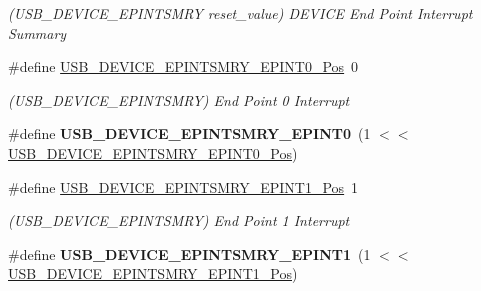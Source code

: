 \begin{DoxyCompactItemize}
\begin{DoxyCompactList}\small\item\em (U\+S\+B\+\_\+\+D\+E\+V\+I\+C\+E\+\_\+\+E\+P\+I\+N\+T\+S\+M\+R\+Y reset\+\_\+value) D\+E\+V\+I\+C\+E End Point Interrupt Summary \end{DoxyCompactList}\item 
\hypertarget{group___s_a_m_l21___u_s_b_ga229995656d4953a009cf0d87c9ba54a9}{}\#define \hyperlink{group___s_a_m_l21___u_s_b_ga229995656d4953a009cf0d87c9ba54a9}{U\+S\+B\+\_\+\+D\+E\+V\+I\+C\+E\+\_\+\+E\+P\+I\+N\+T\+S\+M\+R\+Y\+\_\+\+E\+P\+I\+N\+T0\+\_\+\+Pos}~0\label{group___s_a_m_l21___u_s_b_ga229995656d4953a009cf0d87c9ba54a9}

\begin{DoxyCompactList}\small\item\em (U\+S\+B\+\_\+\+D\+E\+V\+I\+C\+E\+\_\+\+E\+P\+I\+N\+T\+S\+M\+R\+Y) End Point 0 Interrupt \end{DoxyCompactList}\item 
\hypertarget{group___s_a_m_l21___u_s_b_gaaac6c684638a544be30796f3deb13d92}{}\#define {\bfseries U\+S\+B\+\_\+\+D\+E\+V\+I\+C\+E\+\_\+\+E\+P\+I\+N\+T\+S\+M\+R\+Y\+\_\+\+E\+P\+I\+N\+T0}~(1 $<$$<$ \hyperlink{group___s_a_m_l21___u_s_b_ga229995656d4953a009cf0d87c9ba54a9}{U\+S\+B\+\_\+\+D\+E\+V\+I\+C\+E\+\_\+\+E\+P\+I\+N\+T\+S\+M\+R\+Y\+\_\+\+E\+P\+I\+N\+T0\+\_\+\+Pos})\label{group___s_a_m_l21___u_s_b_gaaac6c684638a544be30796f3deb13d92}

\item 
\hypertarget{group___s_a_m_l21___u_s_b_ga9aec51b5c534b1e33e18a4cf3dd67fab}{}\#define \hyperlink{group___s_a_m_l21___u_s_b_ga9aec51b5c534b1e33e18a4cf3dd67fab}{U\+S\+B\+\_\+\+D\+E\+V\+I\+C\+E\+\_\+\+E\+P\+I\+N\+T\+S\+M\+R\+Y\+\_\+\+E\+P\+I\+N\+T1\+\_\+\+Pos}~1\label{group___s_a_m_l21___u_s_b_ga9aec51b5c534b1e33e18a4cf3dd67fab}

\begin{DoxyCompactList}\small\item\em (U\+S\+B\+\_\+\+D\+E\+V\+I\+C\+E\+\_\+\+E\+P\+I\+N\+T\+S\+M\+R\+Y) End Point 1 Interrupt \end{DoxyCompactList}\item 
\hypertarget{group___s_a_m_l21___u_s_b_gad906b52ff36504c59af8a48ad2ef2c76}{}\#define {\bfseries U\+S\+B\+\_\+\+D\+E\+V\+I\+C\+E\+\_\+\+E\+P\+I\+N\+T\+S\+M\+R\+Y\+\_\+\+E\+P\+I\+N\+T1}~(1 $<$$<$ \hyperlink{group___s_a_m_l21___u_s_b_ga9aec51b5c534b1e33e18a4cf3dd67fab}{U\+S\+B\+\_\+\+D\+E\+V\+I\+C\+E\+\_\+\+E\+P\+I\+N\+T\+S\+M\+R\+Y\+\_\+\+E\+P\+I\+N\+T1\+\_\+\+Pos})\label{group___s_a_m_l21___u_s_b_gad906b52ff36504c59af8a48ad2ef2c76}


\end{DoxyCompactItemize}
